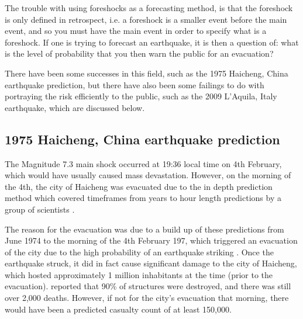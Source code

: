 \documentclass[12pt]{report}
\begin{document}
The trouble with using foreshocks as a forecasting method, is that the foreshock is only defined in retrospect, i.e. a foreshock is a smaller event before the main event, and so you must have the main event in order to specify what is a foreshock. If one is trying to forecast an earthquake, it is then a question of: what is the level of probability that you then warn the public for an evacuation? 

There have been some successes in this field, such as the 1975 Haicheng, China earthquake prediction, but there have also been some failings to do with portraying the risk efficiently to the public, such as the 2009 L'Aquila, Italy earthquake, which are discussed below. 

\subsection{1975 Haicheng, China earthquake prediction}

The Magnitude 7.3 main shock occurred at 19:36 local time on 4th February, which would have usually caused mass devastation. However, on the morning of the 4th, the city of Haicheng was evacuated due to the in depth prediction method which covered timeframes from years to hour length predictions by a group of scientists \citep{Raleigh1977,Wang2006}. 

The reason for the evacuation was due to a build up of these predictions from June 1974 to the morning of the 4th February 197, which triggered an evacuation of the city due to the high probability of an earthquake striking \citep{Raleigh1977}. Once the earthquake struck, it did in fact cause significant damage to the city of Haicheng, which hosted approximately 1 million inhabitants at the time (prior to the evacuation). \cite{Raleigh1977} reported that 90\% of structures were destroyed, and there was still over 2,000 deaths. However, if not for the city's evacuation that morning, there would have been a predicted casualty count of at least 150,000. 
\end{document}
